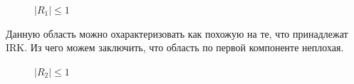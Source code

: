 \documentclass[a4paper,article,14pt]{extarticle}
\begin{document}
\begin{figure}[ht]
\begin{center}
\caption{
\label{stab_area_another_1}
     $\lvert R_{1} \rvert \leq 1$}
\end{center}
\end{figure}

Данную область можно охарактеризовать как похожую на те, что принадлежат IRK. Из чего можем заключить, что область по первой компоненте неплохая.
\pagebreak

\begin{figure}[ht]
\begin{center}
\caption{
\label{stab_area_another_2}
     $\lvert R_{2} \rvert \leq 1$}
\end{center}
\end{figure}
\end{document}
